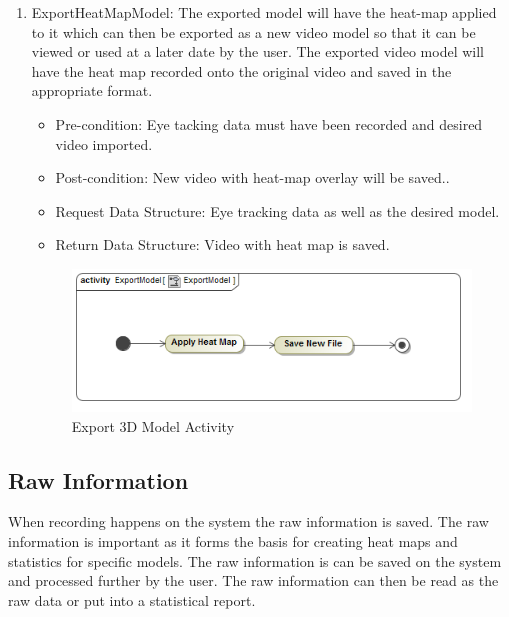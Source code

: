 \begin{enumerate}
			\item{ExportHeatMapModel:}
			The exported model will have the heat-map applied to it which can then be exported as a new video model so that it can be viewed or used at a later date by the user. The exported video model will have the heat map recorded onto the original video and saved in the appropriate format.
			\begin{itemize}
				\item Pre-condition: Eye tacking data must have been recorded and desired video imported.
				\item Post-condition: New video with heat-map overlay will be saved..
				\item Request Data Structure: Eye tracking data as well as the desired model.
				\item Return Data Structure: Video with heat map is saved.
			\end{itemize}
		\begin{figure}[!ht]
			\centering
			\includegraphics[scale=0.5,width=15cm,keepaspectratio]{Diagrams/Activity_Diagram__ExportModel__ExportModel.png}
			\caption{Export 3D Model Activity}
		\end{figure}
	
		\end{enumerate}
		
\subsection{Raw Information}
When recording happens on the system the raw information is saved. The raw information is important as it forms the basis for creating heat maps and statistics for specific models. The raw information is can be saved on the system and processed further by the user. The raw information can then be read as the raw data or put into a statistical report.
\newline

